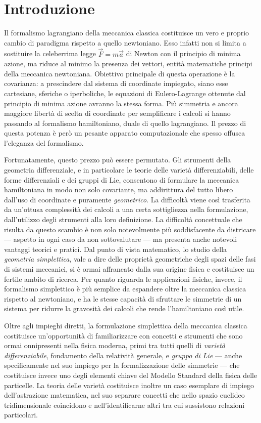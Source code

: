 \chapter*{Introduzione} 
Il formalismo lagrangiano della meccanica classica costituisce un vero e proprio cambio di paradigma rispetto a quello newtoniano. Esso infatti non si limita a sostituire la celeberrima legge $\vec{F}=m\vec{a}$ di Newton con il principio di minima azione, ma riduce al minimo la presenza dei vettori, entità matematiche principi della meccanica newtoniana. Obiettivo principale di questa operazione è la covarianza: a prescindere dal sistema di coordinate impiegato, siano esse cartesiane, sferiche o iperboliche, le equazioni di Eulero-Lagrange ottenute dal principio di minima azione avranno la stessa forma. Più simmetria e ancora maggiore libertà di scelta di coordinate per semplificare i calcoli si hanno passando al formalismo hamiltoniano, duale di quello lagrangiano. Il prezzo di questa potenza è però un pesante apparato computazionale che spesso offusca l'eleganza del formalismo.

Fortunatamente, questo prezzo può essere permutato. Gli strumenti della geometria differenziale, e in particolare le teorie delle varietà differenziabili, delle forme differenziali e dei gruppi di Lie, consentono di formulare la meccanica hamiltoniana in modo non solo covariante, ma addirittura del tutto libero dall'uso di coordinate e puramente \emph{geometrico}. La difficoltà viene così trasferita da un'ottusa complessità dei calcoli a una certa sottigliezza nella formulazione, dall'utilizzo degli strumenti alla loro definizione. La difficoltà concettuale che risulta da questo scambio è non solo notevolmente più soddisfacente da districare --- aspetto in ogni caso da non sottovalutare --- ma presenta anche notevoli vantaggi teorici e pratici. Dal punto di vista matematico, lo studio della \emph{geometria simplettica}, vale a dire delle proprietà geometriche degli spazi delle fasi di sistemi meccanici, si è ormai affrancato dalla sua origine fisica e costituisce un fertile ambito di ricerca. Per quanto riguarda le applicazioni fisiche, invece, il formalismo simplettico è più semplice da espandere oltre la meccanica classica rispetto al newtoniano, e ha le stesse capacità di sfruttare le simmetrie di un sistema per ridurre la gravosità dei calcoli che rende l'hamiltoniano così utile.

Oltre agli impieghi diretti, la formulazione simplettica della meccanica classica costituisce un'opportunità di familiarizzare con concetti e strumenti che sono ormai onnipresenti nella fisica moderna, primi tra tutti quelli di \emph{varietà differenziabile}, fondamento della relatività generale, e \emph{gruppo di Lie} --- anche specificamente nel suo impiego per la formalizzazione delle simmetrie --- che costituisce invece uno degli elementi chiave del Modello Standard della fisica delle particelle. La teoria delle varietà costituisce inoltre un caso esemplare di impiego dell'astrazione matematica, nel suo separare concetti che nello spazio euclideo tridimensionale coincidono e nell'identificarne altri tra cui sussistono relazioni particolari.

